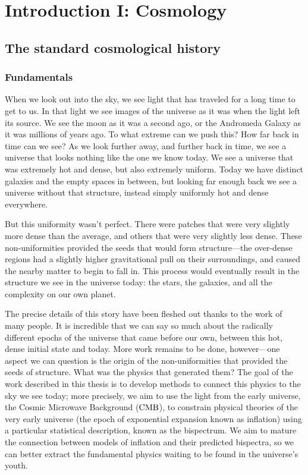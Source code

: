 %
\chapter{Introduction I: Cosmology}\label{chapter:intro_general}
\section{The standard cosmological history}\label{sec:general_intro}
    \subsection{Fundamentals}
When we look out into the sky, we see light that has traveled for a long time to get to us.
In that light we see images of the universe as it was when the light left its source.
We see the moon as it was a second ago, or the Andromeda Galaxy as it was millions of
years ago. To what extreme can we push this? How far back in time can we see? As we look further
away, and further back in time, we see a universe that looks nothing like the one we know today.
We see a universe that was extremely hot and dense, but also extremely uniform. Today
we have distinct galaxies and the empty spaces in between, but looking far enough back we see a universe
without that structure, instead simply uniformly hot and dense everywhere.


But this uniformity wasn't perfect. There were patches that were very slightly more dense than the average,
and others that were very slightly less dense. These non-uniformities provided the seeds that would form
structure---the over-dense regions had a slightly higher gravitational pull on their surroundings,
and caused the nearby matter to begin to fall in. This process would eventually result in the structure
we see in the universe today: the stars, the galaxies, and all the complexity on our own planet.


The precise details of this story have been fleshed out thanks to the work of many people.
It is incredible that we can say so much about the radically different epochs of the universe that came before our own,
between this hot, dense initial state and today.
More work remains to be done, however---one aspect we can question is the origin of the non-uniformities
that provided the seeds of structure. What was the physics that generated them?
The goal of the work described in this thesis is to develop methods to connect this physics
to the sky we see today; more precisely, we aim to use the light from
the early universe, the Cosmic Microwave Background ($\text{CMB}$),
to constrain physical theories of the very early universe (the epoch of exponential
expansion known as inflation) using a particular
statistical description, known as the bispectrum.
We aim to mature the connection between models of inflation and their predicted bispectra, so we can better
extract the fundamental physics waiting to be found in the universe's youth.


